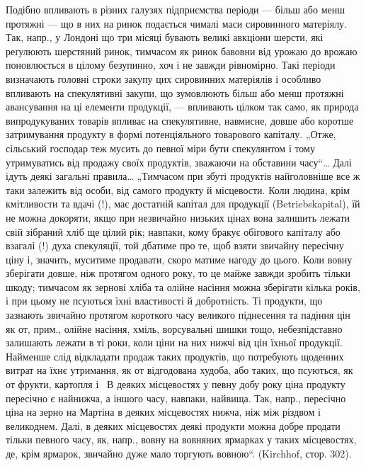 Подібно впливають в різних галузях підприємства періоди — більш
або менш протяжні — що в них на ринок подається чималі маси сировинного
матеріялу. Так, напр., у Лондоні що три місяці бувають великі
авкціони шерсти, які реґулюють шерстяний ринок, тимчасом як ринок
бавовни від урожаю до врожаю поновлюється в цілому безупинно, хоч
і не завжди рівномірно. Такі періоди визначають головні строки закупу
цих сировинних матеріялів і особливо впливають на спекулятивні закупи,
що зумовлюють більш або менш протяжні авансування на ці елементи
продукції, — впливають цілком так само, як природа випродукуваних
товарів впливає на спекулятивне, навмисне, довше або коротше затримування
продукту в формі потенціяльного товарового капіталу. „Отже,
сільський господар теж мусить до певної міри бути спекулянтом і тому
утримуватись від продажу своїх продуктів, зважаючи на обставини часу“\dots{}
Далі ідуть деякі загальні правила\dots{} „Тимчасом при збуті продуктів найголовніше
все ж таки залежить від особи, від самого продукту й місцевости.
Коли людина, крім кмітливости та вдачі (!), має достатній капітал для продукції
(Betriebskapital), їй не можна докоряти, якщо при незвичайно низьких цінах
вона залишить лежати свій зібраний хліб ще цілий рік; навпаки, кому
бракує обігового капіталу або взагалі (!) духа спекуляції, той дбатиме
про те, щоб взяти звичайну пересічну ціну і, значить, муситиме продавати,
скоро матиме нагоду до цього. Коли вовну зберігати довше, ніж протягом
одного року, то це майже завжди зробить тільки шкоду; тимчасом як
зернові хліба та олійне насіння можна зберігати кілька років, і при цьому
не псуються їхні властивості й добротність. Ті продукти, що зазнають
звичайно протягом короткого часу великого піднесення та падіння цін як
от, прим., олійне насіння, хміль, ворсувальні шишки тощо, небезпідставно
залишають лежати в ті роки, коли ціни на них нижчі від цін їхньої продукції.
Найменше слід відкладати продаж таких продуктів, що потребують
щоденних витрат на їхнє утримання, як от відгодована худоба, або таких,
що псуються, як от фрукти, картопля і~ В деяких місцевостях у певну
добу року ціна продукту пересічно є найнижча, а іншого часу, навпаки,
найвища. Так, напр., пересічно ціна на зерно на Мартіна в деяких місцевостях
нижча, ніж між різдвом і великоднем. Далі, в деяких місцевостях
деякі продукти можна добре продати тільки певного часу, як, напр.,
вовну на вовняних ярмарках у таких місцевостях, де, крім ярмарок, звичайно
дуже мало торгують вовною“. (Kirchhof, стор. 302).

